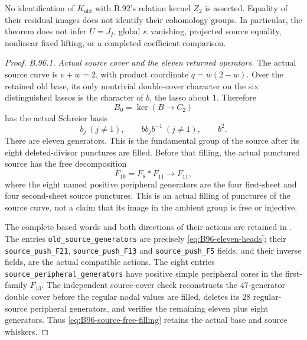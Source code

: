 No identification of $K_{\mathrm{old}}$ with B.92's relation kernel
$Z_2$ is asserted.  Equality of their residual images does not
identify their cohomology groups.  In particular, the theorem does
not infer $U=J_I$, global $\kappa$ vanishing, projected source equality,
nonlinear fixed lifting, or a completed coefficient comparison.

\begin{proof}
\emph{B.96.1. Actual source cover and the eleven returned operators.}
The actual source curve is $v+w=2$, with product coordinate
$q=w(2-w)$.  Over the retained old base, its only nontrivial
double-cover character on the six distinguished lassos is the
character of $b$, the lasso about $1$.  Therefore
\[
 B_0=\ker(B\longrightarrow C_2)
\]
has the actual Schreier basis
\begin{equation}\label{eq:B96-eleven-heads}
 b_j\ (j\ne1),\qquad b b_j b^{-1}\ (j\ne1),\qquad b^2.
\end{equation}
There are eleven generators.  This is the fundamental group of
the source after its eight deleted-divisor punctures are filled.
Before that filling, the actual punctured source has the free
decomposition
\begin{equation}\label{eq:B96-source-free-filling}
 F_{19}=F_8*F_{11}\longrightarrow F_{11},
\end{equation}
where the eight named positive peripheral generators are the four
first-sheet and four second-sheet source punctures.  This is an
actual filling of punctures of the source curve, not a claim that
its image in the ambient group is free or injective.

The complete based words and both directions of their actions are
retained in
.
The entries \texttt{old\_source\_generators} are precisely
\eqref{eq:B96-eleven-heads}; their \texttt{source\_push\_F21},
\texttt{source\_push\_F13} and \texttt{source\_push\_F5} fields,
and their inverse fields, are the actual compatible actions.
The eight entries \texttt{source\_peripheral\_generators} have
positive simple peripheral cores in the first-family $F_{13}$.
The independent source-cover check reconstructs the $47$-generator
double cover before the regular nodal values are filled, deletes
its $28$ regular-source peripheral generators, and verifies the
remaining eleven plus eight generators.  Thus
\eqref{eq:B96-source-free-filling} retains the actual base and
source whiskers.


\end{proof}
